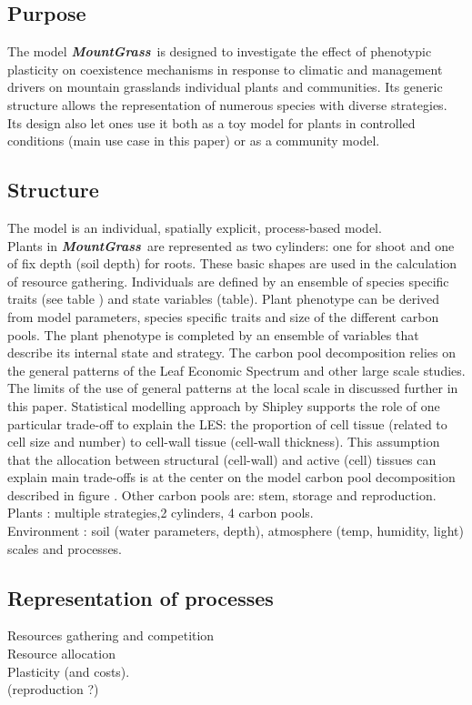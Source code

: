 \documentclass[review]{elsarticle}
\newcommand{\model}{\textbf{\textit{MountGrass}}~}
\begin{document}
\subsection{Purpose}
The model \model is designed to investigate the effect of phenotypic plasticity on coexistence mechanisms in response to climatic and management drivers on mountain grasslands individual plants and communities. Its generic structure allows the representation of numerous species with diverse strategies. Its design also let ones use it both as a toy model for plants in controlled conditions (main use case in this paper) or as a community model.\\

\subsection{Structure}
The model is an individual, spatially explicit, process-based model.\\
Plants in \model are represented as two cylinders: one for shoot and one of fix depth (soil depth) for roots. These basic shapes are used in the calculation of resource gathering. Individuals are defined by an ensemble of species specific traits (see table ) and state variables (table). Plant phenotype can be derived from model parameters, species specific traits and size of the different carbon pools. The plant phenotype is completed by an ensemble of variables that describe its internal state and strategy. The carbon pool decomposition relies on the general patterns of the Leaf Economic Spectrum and other large scale studies. The limits of the use of general patterns at the local scale in discussed further in this paper. Statistical modelling approach by Shipley supports the role of one particular trade-off to explain the LES: the proportion of cell tissue (related to cell size and number) to cell-wall tissue (cell-wall thickness). This assumption that the allocation between structural (cell-wall) and active (cell) tissues can explain main trade-offs is at the center on the model carbon pool decomposition described in figure . Other carbon pools are: stem, storage and reproduction. %
Plants : multiple strategies,2 cylinders, 4 carbon pools.\\
Environment : soil (water parameters, depth), atmosphere (temp, humidity, light)\\
scales and processes.

\subsection{Representation of processes}
Resources gathering and competition\\
Resource allocation\\
Plasticity (and costs).\\
(reproduction ?)\\
\end{document}

